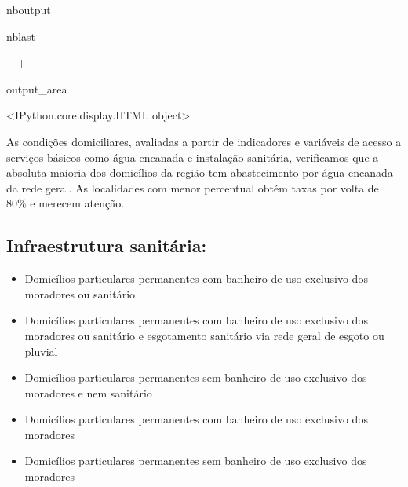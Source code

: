 \documentclass[letterpaper,10pt,brazil]{sphinxmanual}
\newlength\nbsphinxcodecellspacing
\begin{document}
\begin{sphinxuseclass}{nboutput}
\begin{sphinxuseclass}{nblast}
{

\kern-\sphinxverbatimsmallskipamount\kern-\baselineskip
\kern+\FrameHeightAdjust\kern-\fboxrule
\vspace{\nbsphinxcodecellspacing}

\begin{sphinxuseclass}{output_area}
\begin{sphinxuseclass}{}


\begin{sphinxVerbatim}[commandchars=\\\{\}]
\llap{\color{nbsphinxout}[4]:\,\hspace{\fboxrule}\hspace{\fboxsep}}<IPython.core.display.HTML object>
\end{sphinxVerbatim}



\end{sphinxuseclass}
\end{sphinxuseclass}
}

\end{sphinxuseclass}
\end{sphinxuseclass}
\sphinxAtStartPar
As condições domiciliares, avaliadas a partir de indicadores e variáveis de acesso a serviços básicos como água encanada e instalação sanitária, verificamos que a absoluta maioria dos domicílios da região tem abastecimento por água encanada da rede geral. As localidades com menor percentual obtém taxas por volta de 80\% e merecem atenção.


\subsection{Infraestrutura sanitária:}
\label{\detokenize{exemplos/analise_domicilios:Infraestrutura-sanit_xe1ria:}}\begin{itemize}
\item {} 
 Domicílios particulares permanentes com banheiro de uso exclusivo dos moradores ou sanitário

\item {} 
 Domicílios particulares permanentes com banheiro de uso exclusivo dos moradores ou sanitário e esgotamento sanitário via rede geral de esgoto ou pluvial

\item {} 
 Domicílios particulares permanentes sem banheiro de uso exclusivo dos moradores e nem sanitário

\item {} 
 Domicílios particulares permanentes com banheiro de uso exclusivo dos moradores

\item {} 
 Domicílios particulares permanentes sem banheiro de uso exclusivo dos moradores

\end{itemize}
\end{document}
